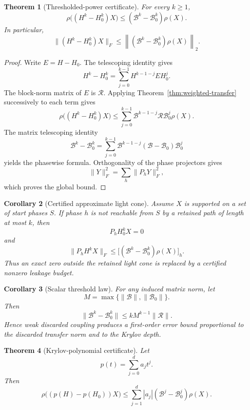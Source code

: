 \documentclass[11pt]{article}
\newtheorem{theorem}{Theorem}[section]
\newtheorem{corollary}[theorem]{Corollary}
\theoremstyle{definition}
\theoremstyle{remark}
\begin{document}
\begin{theorem}[Thresholded-power certificate]
\label{thm:thresholded-power}
For every $k\geq1$,
\[
\boxed{
\rho\bigl((H^k-H_0^k)X\bigr)
\leq
(\mathcal B^k-\mathcal B_0^k)\rho(X).
}
\]
In particular,
\[
\boxed{
\lVert(H^k-H_0^k)X\rVert_F
\leq
\left\lVert(\mathcal B^k-\mathcal B_0^k)\rho(X)\right\rVert_2.
}
\]
\end{theorem}

\begin{proof}
Write $E=H-H_0$.  The telescoping identity gives
\[
H^k-H_0^k
=
\sum_{j=0}^{k-1}H^{k-1-j}EH_0^j.
\]
The block-norm matrix of $E$ is $\mathcal R$.  Applying
Theorem~\ref{thm:weighted-transfer} successively to each term gives
\[
\rho\bigl((H^k-H_0^k)X\bigr)
\leq
\sum_{j=0}^{k-1}
\mathcal B^{k-1-j}\mathcal R\mathcal B_0^j\rho(X).
\]
The matrix telescoping identity
\[
\mathcal B^k-\mathcal B_0^k
=
\sum_{j=0}^{k-1}
\mathcal B^{k-1-j}(\mathcal B-\mathcal B_0)\mathcal B_0^j
\]
yields the phasewise formula.  Orthogonality of the phase projectors gives
\[
\lVert Y\rVert_F^2=\sum_h\lVert P_hY\rVert_F^2,
\]
which proves the global bound.
\end{proof}

\begin{corollary}[Certified approximate light cone]
\label{cor:approx-lightcone}
Assume $X$ is supported on a set of start phases $S$.  If phase $h$ is not
reachable from $S$ by a retained path of length at most $k$, then
\[
P_hH_0^kX=0
\]
and
\[
\boxed{
\lVert P_hH^kX\rVert_F
\leq
\bigl[(\mathcal B^k-\mathcal B_0^k)\rho(X)\bigr]_h.
}
\]
Thus an exact zero outside the retained light cone is replaced by a certified
nonzero leakage budget.
\end{corollary}

\begin{corollary}[Scalar threshold law]
For any induced matrix norm, let
\[
M=\max\{\lVert\mathcal B\rVert,\lVert\mathcal B_0\rVert\}.
\]
Then
\[
\boxed{
\lVert\mathcal B^k-\mathcal B_0^k\rVert
\leq
kM^{k-1}\lVert\mathcal R\rVert.
}
\]
Hence weak discarded coupling produces a first-order error bound proportional
to the discarded transfer norm and to the Krylov depth.
\end{corollary}

\begin{theorem}[Krylov-polynomial certificate]
\label{thm:polynomial-certificate}
Let
\[
p(t)=\sum_{j=0}^d a_jt^j.
\]
Then
\[
\boxed{
\rho\bigl((p(H)-p(H_0))X\bigr)
\leq
\sum_{j=1}^d
|a_j|(\mathcal B^j-\mathcal B_0^j)\rho(X).
}
\]
\end{theorem}
\end{document}
